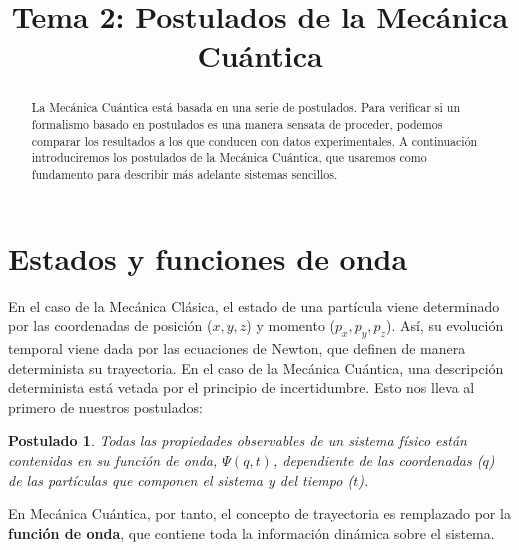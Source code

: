 \documentclass{tufte-handout}
\title[Química Física II: Tema 2, Postulados]{
Tema 2: Postulados de la Mecánica Cuántica}
\date{}  %
\newtheorem{theorem}{Postulado}
\begin{document}
\maketitle%

\begin{abstract}
\noindent La Mecánica Cuántica está basada en una serie de
postulados. Para verificar si un formalismo
basado en postulados es una manera sensata de proceder, 
podemos comparar los resultados a los 
que conducen con datos experimentales.
A continuación introduciremos
los postulados de la Mecánica Cuántica, que usaremos 
como fundamento para describir más adelante sistemas
sencillos.
\end{abstract}




\section*{Estados y funciones de onda}
En el caso de la Mecánica Clásica, el estado de una partícula
viene determinado por las  coordenadas de posición ($x, y, z$) 
y momento ($p_x, p_y, p_z$). Así, su evolución temporal viene
dada por las ecuaciones de Newton, que definen de manera 
determinista su trayectoria. En el caso de la Mecánica Cuántica,
una descripción determinista está vetada por el principio de
incertidumbre. Esto nos lleva al primero de nuestros 
postulados:

\begin{theorem}
Todas las propiedades observables de un sistema físico 
están contenidas en su función de onda, $\Psi(q,t)$,
dependiente de las coordenadas ($q$) de las
partículas que componen el sistema y del tiempo ($t$). 
\end{theorem}

En Mecánica Cuántica, por tanto, el concepto de 
trayectoria es remplazado por la \textbf{función de
onda}, que contiene toda la información dinámica 
sobre el sistema.
\end{document}
